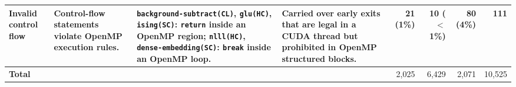 \begin{table}[!t]
\begin{tabular}{@{}>{\raggedright\arraybackslash}p{1.9cm}>{\raggedright\arraybackslash}p{2.2cm}>{\raggedright\arraybackslash}p{4.9cm}>{\raggedright\arraybackslash}p{3.1cm}rrrr@{}}
\midrule
Invalid control flow & Control-flow statements violate OpenMP execution rules. & \texttt{background-subtract(CL)}, \texttt{glu(HC)}, \texttt{ising(SC)}: \texttt{return} inside an OpenMP region; \texttt{nlll(HC)}, \texttt{dense-embedding(SC)}: \texttt{break} inside an OpenMP loop. & Carried over early exits that are legal in a CUDA thread but prohibited in OpenMP structured blocks. & 21 (1\%) & 10 ($<$1\%) & 80 (4\%) & 111 \\
\midrule
\textbf{Total} & & & & 2{,}025 & 6{,}429 & 2{,}071 & 10{,}525 \\
\bottomrule
\end{tabular}
\end{table}
